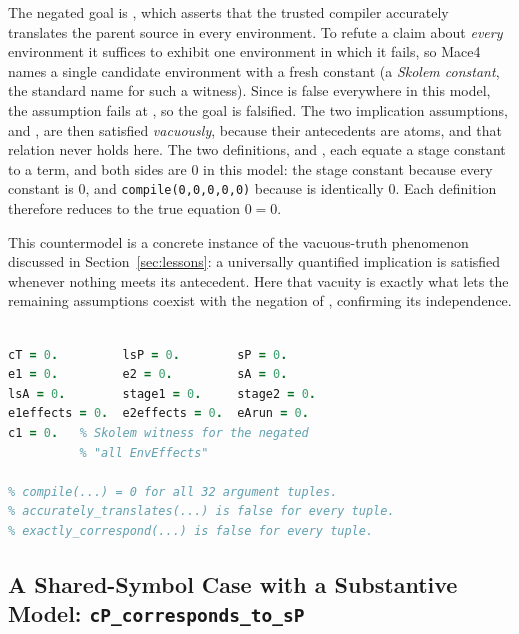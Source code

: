 The negated goal is , which asserts that the trusted compiler  accurately translates the parent source  in every environment. To refute a claim about \emph{every} environment it suffices to exhibit one environment in which it fails, so Mace4 names a single candidate environment with a fresh constant  (a \emph{Skolem constant}, the standard name for such a witness). Since  is false everywhere in this model, the assumption fails at , so the goal is falsified. The two implication assumptions,  and , are then satisfied \emph{vacuously}, because their antecedents are  atoms, and that relation never holds here. The two definitions,  and , each equate a stage constant to a  term, and both sides are $0$ in this model: the stage constant because every constant is $0$, and \texttt{compile(0,0,0,0,0)} because  is identically $0$. Each definition therefore reduces to the true equation $0 = 0$.

This countermodel is a concrete instance of the vacuous-truth phenomenon discussed in Section~\ref{sec:lessons}: a universally quantified implication is satisfied whenever nothing meets its antecedent. Here that vacuity is exactly what lets the remaining assumptions coexist with the negation of , confirming its independence.

\begin{lstlisting}[language=Prolog, float=tb, label=lst:ct, caption={Satisfying model for cT-compiles-sP (ddc-independence-2): every constant is $0$, \texttt{compile} is identically $0$, and both relations are false everywhere.}]
% Interpretation of size 2 {0,1}

cT = 0.         lsP = 0.        sP = 0.
e1 = 0.         e2 = 0.         sA = 0.
lsA = 0.        stage1 = 0.     stage2 = 0.
e1effects = 0.  e2effects = 0.  eArun = 0.
c1 = 0.   % Skolem witness for the negated
          % "all EnvEffects"

% compile(...) = 0 for all 32 argument tuples.
% accurately_translates(...) is false for every tuple.
% exactly_correspond(...) is false for every tuple.
\end{lstlisting}

\subsection{A Shared-Symbol Case with a Substantive Model: \texttt{cP\_corresponds\_to\_sP}}

